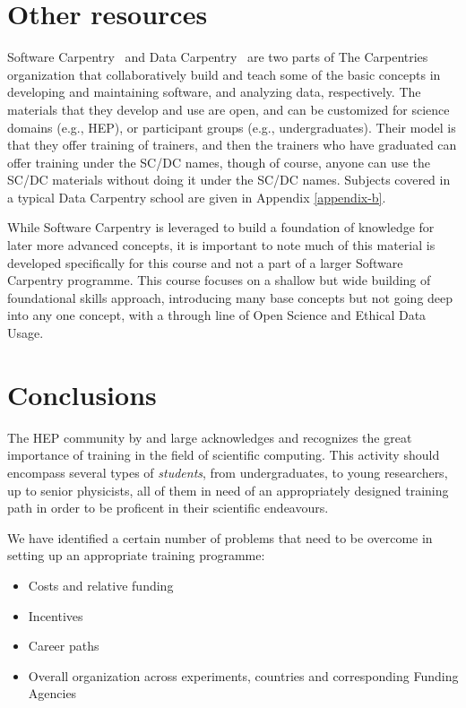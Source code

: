 \documentclass[12pt,a4paper]{article}
\begin{document}
\section{Other resources}

Software Carpentry~\cite{SoftwareCarpentry} and Data
Carpentry~\cite{DataCarpentry} are two parts of The
Carpentries organization that collaboratively build and teach some of the basic
concepts in developing and maintaining software, and analyzing data,
respectively.  The materials that they develop and use are open, and can be
customized for science domains (e.g., HEP), or participant groups (e.g.,
undergraduates). Their model is that they offer training of trainers, and then
the trainers who have graduated can offer training under the SC/DC names, though
of course, anyone can use the SC/DC materials without doing it under the SC/DC
names.
Subjects covered in a typical Data Carpentry school are given in Appendix
\ref{appendix-b}.


While Software Carpentry is leveraged to build a foundation of knowledge for
later more advanced concepts, it is important to note much of this material is
developed specifically for this course and not a part of a larger Software
Carpentry programme. This course focuses on a shallow but wide building of
foundational skills approach, introducing many base concepts but not going deep
into any one concept, with a through line of Open Science and Ethical Data
Usage.

\section{Conclusions}

The HEP community by and large acknowledges and recognizes the great importance
of training in the field of scientific computing. This activity should encompass
several types of \emph{students}, from undergraduates, to young researchers,
up to senior physicists, all of them in need of an appropriately designed training
path in order to be proficent in their scientific endeavours.

We have identified a certain number of problems that need to be overcome in
setting up an appropriate training programme:
\begin{itemize}
    \item Costs and relative funding
    \item Incentives
    \item Career paths
    \item Overall organization across experiments, countries and 
    corresponding Funding Agencies
\end{itemize}
\end{document}

